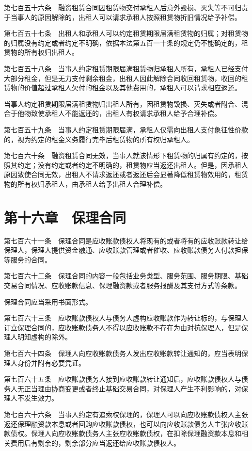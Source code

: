 \documentclass[UTF8,12pt,a4paper]{ctexbook}
\begin{document}
第七百五十六条　融资租赁合同因租赁物交付承租人后意外毁损、灭失等不可归责于当事人的原因解除的，出租人可以请求承租人按照租赁物折旧情况给予补偿。

第七百五十七条　出租人和承租人可以约定租赁期限届满租赁物的归属；对租赁物的归属没有约定或者约定不明确，依据本法第五百一十条的规定仍不能确定的，租赁物的所有权归出租人。

第七百五十八条　当事人约定租赁期限届满租赁物归承租人所有，承租人已经支付大部分租金，但是无力支付剩余租金，出租人因此解除合同收回租赁物，收回的租赁物的价值超过承租人欠付的租金以及其他费用的，承租人可以请求相应返还。

当事人约定租赁期限届满租赁物归出租人所有，因租赁物毁损、灭失或者附合、混合于他物致使承租人不能返还的，出租人有权请求承租人给予合理补偿。

第七百五十九条　当事人约定租赁期限届满，承租人仅需向出租人支付象征性价款的，视为约定的租金义务履行完毕后租赁物的所有权归承租人。

第七百六十条　融资租赁合同无效，当事人就该情形下租赁物的归属有约定的，按照其约定；没有约定或者约定不明确的，租赁物应当返还出租人。但是，因承租人原因致使合同无效，出租人不请求返还或者返还后会显著降低租赁物效用的，租赁物的所有权归承租人，由承租人给予出租人合理补偿。

\section*{第十六章　保理合同}

第七百六十一条　保理合同是应收账款债权人将现有的或者将有的应收账款转让给保理人，保理人提供资金融通、应收账款管理或者催收、应收账款债务人付款担保等服务的合同。

第七百六十二条　保理合同的内容一般包括业务类型、服务范围、服务期限、基础交易合同情况、应收账款信息、保理融资款或者服务报酬及其支付方式等条款。

保理合同应当采用书面形式。

第七百六十三条　应收账款债权人与债务人虚构应收账款作为转让标的，与保理人订立保理合同的，应收账款债务人不得以应收账款不存在为由对抗保理人，但是保理人明知虚构的除外。

第七百六十四条　保理人向应收账款债务人发出应收账款转让通知的，应当表明保理人身份并附有必要凭证。

第七百六十五条　应收账款债务人接到应收账款转让通知后，应收账款债权人与债务人无正当理由协商变更或者终止基础交易合同，对保理人产生不利影响的，对保理人不发生效力。

第七百六十六条　当事人约定有追索权保理的，保理人可以向应收账款债权人主张返还保理融资款本息或者回购应收账款债权，也可以向应收账款债务人主张应收账款债权。保理人向应收账款债务人主张应收账款债权，在扣除保理融资款本息和相关费用后有剩余的，剩余部分应当返还给应收账款债权人。
\end{document}
